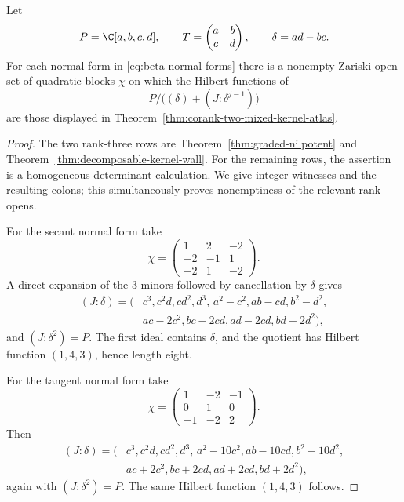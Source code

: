 \begin{lemma}
\label{lem:nine-orbit-colons}
Let
\[
 P=\C[a,b,c,d],\qquad
 T=\begin{pmatrix}a&b\\c&d\end{pmatrix},\qquad
 \delta=ad-bc.
\]
For each normal form in \eqref{eq:beta-normal-forms} there is a
nonempty Zariski-open set of quadratic blocks \(\chi\) on which the
Hilbert functions of
\[
 P/\bigl((\delta)+(J:\delta^{j-1})\bigr)
\]
are those displayed in
Theorem~\ref{thm:corank-two-mixed-kernel-atlas}.
\end{lemma}

\begin{proof}
The two rank-three rows are
Theorem~\ref{thm:graded-nilpotent} and
Theorem~\ref{thm:decomposable-kernel-wall}.  For the remaining rows,
the assertion is a homogeneous determinant calculation.  We give
integer witnesses and the resulting colons; this simultaneously
proves nonemptiness of the relevant rank opens.

For the secant normal form take
\[
 \chi=
 \begin{pmatrix}
  1&2&-2\\-2&-1&1\\-2&1&-2
 \end{pmatrix}.
\]
A direct expansion of the \(3\)-minors followed by cancellation by
\(\delta\) gives
\[
\begin{split}
 (J:\delta)=(&c^3,c^2d,cd^2,d^3,\,
 a^2-c^2,ab-cd,b^2-d^2,\\
 &ac-2c^2,bc-2cd,ad-2cd,bd-2d^2),
\end{split}
\]
and \((J:\delta^2)=P\).  The first ideal contains \(\delta\), and
the quotient has Hilbert function \((1,4,3)\), hence length eight.

For the tangent normal form take
\[
 \chi=
 \begin{pmatrix}
  1&-2&-1\\0&1&0\\-1&-2&2
 \end{pmatrix}.
\]
Then
\[
\begin{split}
 (J:\delta)=(&c^3,c^2d,cd^2,d^3,\,
 a^2-10c^2,ab-10cd,b^2-10d^2,\\
 &ac+2c^2,bc+2cd,ad+2cd,bd+2d^2),
\end{split}
\]
again with \((J:\delta^2)=P\).  The same Hilbert function
\((1,4,3)\) follows.


\end{proof}
